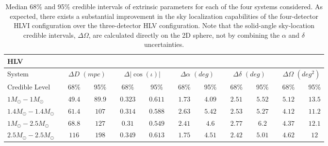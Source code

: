 \documentclass[11pt,a4paper]{emulateapj} 
\begin{document}
 
\begin{table}[t!]
\centering
\caption{Median 68\% and 95\% credible intervals of extrinsic parameters for
  each of the four systems considered.  As expected, there exists a
  substantial improvement in the sky localization capabilities of the
  four-detector HLVI configuration over the three-detector HLV
  configuration.  Note that the solid-angle sky-location credible
  intervals, $\Delta\Omega$, are calculated directly on the 2D sphere,
  not by combining the $\alpha$ and $\delta$ uncertainties.}
  
  \tabcolsep=0.11cm
      {\renewcommand{\arraystretch}{1.3} 
\begin{tabular}{lcccccccccccccccccccc}

\\ HLV\\

\hline\hline System & \vline & \multicolumn{3}{c}{$\Delta D$ $(mpc)$} & \vline &
\multicolumn{3}{c}{$\Delta |\cos(\iota)|$} & \vline & \multicolumn{3}{c}{$\Delta \alpha$ $(deg)$} & \vline &
\multicolumn{3}{c}{$\Delta \delta$ $(deg)$} & \vline & \multicolumn{3}{c}{$\Delta\Omega$
$(deg^2)$}\\\hline
Credible Level & \vline & 68\% & \vline & 95\% & \vline & 68\% & \vline & 95\% & \vline & 68\% & \vline & 95\% & \vline & 68\% & \vline & 95\% & \vline & 68\% & \vline & 95\% \\
 \hline\hline 

$1M_{\odot}-1M_{\odot}$ & \vline &$49.4$ & \vline &$89.9$ & \vline & $0.323$ & \vline &$0.611$ & \vline & $1.73$ & \vline &$4.09$ & \vline & $2.51$ & \vline &$5.52$ & \vline & $5.12$ & \vline &$13.5$\\\hline$1.4M_{\odot}-1.4M_{\odot}$ & \vline &$61.4$ & \vline &$107$ & \vline & $0.314$ & \vline &$0.588$ & \vline & $2.63$ & \vline &$5.42$ & \vline & $2.53$ & \vline &$5.27$ & \vline & $4.12$ & \vline &$11.2$\\\hline$1M_{\odot}-2.5M_{\odot}$ & \vline &$68.8$ & \vline &$127$ & \vline & $0.31$ & \vline &$0.549$ & \vline & $2.41$ & \vline &$4.6$ & \vline & $2.77$ & \vline &$6.2$ & \vline & $4.37$ & \vline &$12.1$\\\hline$2.5M_{\odot}-2.5M_{\odot}$ & \vline &$116$ & \vline &$198$ & \vline & $0.349$ & \vline &$0.613$ & \vline & $1.75$ & \vline &$4.51$ & \vline & $2.42$ & \vline &$5.01$ & \vline & $4.62$ & \vline &$12$\\

\hline\hline



\end{tabular}}
\end{table}
\end{document}
